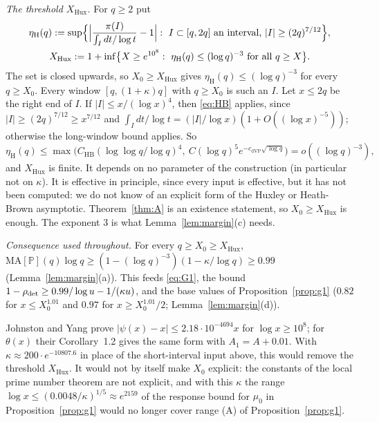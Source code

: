 \emph{The threshold $X_{\mathrm{Hux}}$.} For $q\ge2$ put
\begin{equation}\label{eq:huxley}
\begin{gathered}
  \eta_{\mathrm H}(q):=\sup\Bigl\{\Bigl|\frac{\pi(I)}{\int_I dt/\log t}-1\Bigr|:\ I\subset[q,2q]\text{ an interval, }|I|\ge(2q)^{7/12}\Bigr\},\\
  X_{\mathrm{Hux}}:=1+\inf\bigl\{X\ge e^{10^8}:\ \eta_{\mathrm H}(q)\le(\log q)^{-3}\text{ for all }q\ge X\bigr\}.
\end{gathered}
\end{equation}
The set is closed upwards, so $X_0\ge X_{\mathrm{Hux}}$ gives $\eta_{\mathrm H}(q)\le(\log q)^{-3}$ for every $q\ge X_0$.
Every window $[q,(1+\kappa)q]$ with $q\ge X_0$ is such an $I$. Let $x\le2q$ be the right end of $I$. If $|I|\le x/(\log x)^4$, then
\eqref{eq:HB} applies, since $|I|\ge(2q)^{7/12}\ge x^{7/12}$ and $\int_Idt/\log t=(|I|/\log x)(1+O((\log x)^{-5}))$; otherwise the
long-window bound applies. So
\[
  \eta_{\mathrm H}(q)\le\max\bigl(C_{\mathrm{HB}}(\log\log q/\log q)^4,\ C(\log q)^5e^{-c_{\mathrm{dVP}}\sqrt{\log q}}\bigr)=o((\log q)^{-3}),
\]
and $X_{\mathrm{Hux}}$ is finite. It depends on no parameter of the construction (in particular not on $\kappa$). It is effective in
principle, since every input is effective, but it has not been computed: we do not know of an explicit form of the Huxley or
Heath-Brown asymptotic. Theorem~\ref{thm:A} is an existence statement, so $X_0\ge X_{\mathrm{Hux}}$ is enough. The exponent $3$ is
what Lemma~\ref{lem:margin}(c) needs.

\emph{Consequence used throughout.} For every $q\ge X_0\ge X_{\mathrm{Hux}}$,
$\mathrm{MA}[\mathbb P](q)\log q\ge(1-(\log q)^{-3})(1-\kappa/\log q)\ge0.99$ (Lemma~\ref{lem:margin}(a)). This feeds \eqref{eq:G1},
the bound $1-\rho_{\mathrm{det}}\ge0.99/\log u-1/(\kappa u)$, and the base values of Proposition~\ref{prop:g1} ($0.82$ for $x\le X_0^{1.01}$ and
$0.97$ for $x\ge X_0^{1.01}/2$; Lemma~\ref{lem:margin}(d)).

\begin{remark}
Johnston and Yang \cite[Thm.~1.1 and Table~1, row $X=10^8$]{JohnstonYang2023} prove $|\psi(x)-x|\le2.18\cdot10^{-4694}x$ for
$\log x\ge10^8$; for $\theta(x)$ their Corollary~1.2 gives the same form with $A_1=A+0.01$. With $\kappa\approx200\cdot e^{-10807.6}$
in place of the short-interval input above, this would remove the threshold $X_{\mathrm{Hux}}$. It would not by itself make $X_0$
explicit: the constants of the local prime number theorem are not explicit, and with this $\kappa$ the range
$\log x\le(0.0048/\kappa)^{1/5}\approx e^{2159}$ of the response bound for $\mu_0$ in Proposition~\ref{prop:g1} would no longer cover range (A) of
Proposition~\ref{prop:g1}.
\end{remark}

